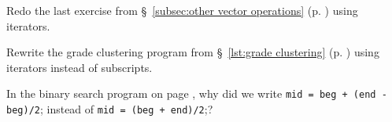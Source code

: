 %
%
\begin{question}
Redo the last exercise from \S~\ref{subsec:other vector operations} (p. \pageref{subsec:other vector operations}) using iterators.
\end{question}

\begin{question}
Rewrite the grade clustering program from \S~\ref{lst:grade clustering} (p. \pageref{lst:grade clustering})
using iterators instead of subscripts.
\end{question}

\begin{question}
In the binary search program on page \pageref{lst:binary search}, why did we write
\verb|mid = beg + (end - beg)/2|; instead of \verb|mid = (beg + end)/2|;?
\end{question}
